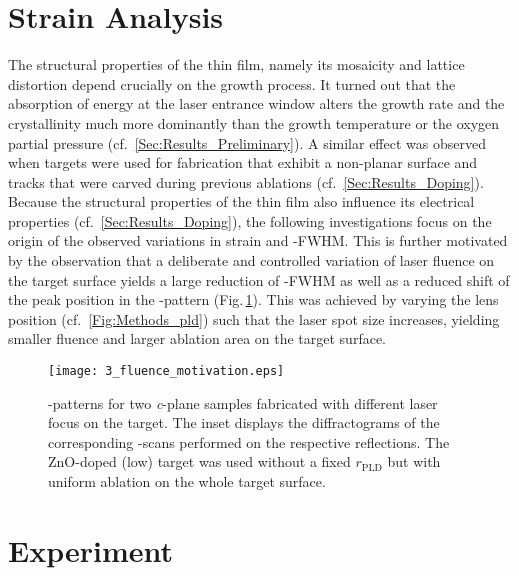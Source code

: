 \section{Strain Analysis}
    \label{Sec:Results_Energy}
The structural properties of the thin film, namely its mosaicity and lattice distortion depend crucially on the growth process.
It turned out that the absorption of energy at the laser entrance window alters the growth rate and the crystallinity much more dominantly than the growth temperature or the oxygen partial pressure (cf.\ \ref{Sec:Results_Preliminary}).
A similar effect was observed when targets were used for fabrication that exhibit a non-planar surface and tracks that were carved during previous ablations (cf.\ \ref{Sec:Results_Doping}).
Because the structural properties of the thin film also influence its electrical properties (cf.\ \ref{Sec:Results_Doping}), the following investigations focus on the origin of the observed variations in strain and \textomega-FWHM.
This is further motivated by the observation that a deliberate and controlled variation of laser fluence on the target surface yields a large reduction of \textomega-FWHM as well as a reduced shift of the peak position in the \thetaomega-pattern (Fig.\,\ref{Fig:Results_3_motivation}).
This was achieved by varying the lens position (cf.\ \ref{Fig:Methods_pld}) such that the laser spot size increases, yielding smaller fluence and larger ablation area on the target surface.
\begin{figure}
    \centering
    \texttt{[image: 3\_fluence\_motivation.eps]}
    \caption{
    \thetaomega-patterns for two \textit{c}-plane samples fabricated with different laser focus on the target.
    The inset displays the diffractograms of the corresponding \textomega-scans performed on the respective reflections.
    The ZnO-doped (low) target was used without a fixed $r_\mathrm{PLD}$ but with uniform ablation on the whole target surface.
    }
    \label{Fig:Results_3_motivation}
\end{figure}

\section{Experiment}